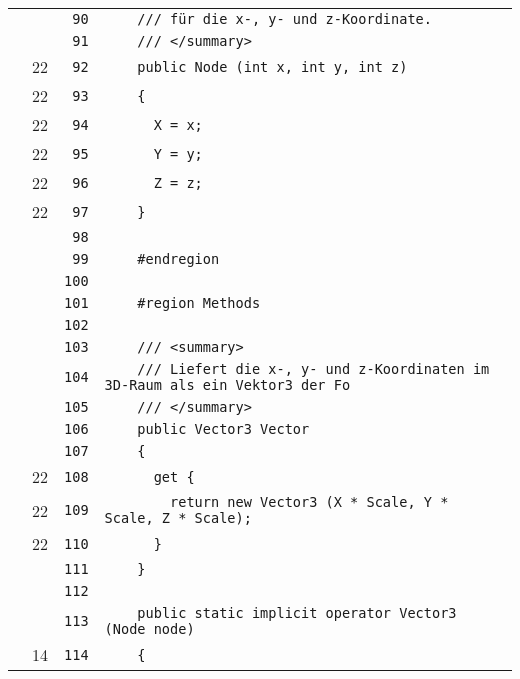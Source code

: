 \documentclass[a4paper,10pt]{article}
\begin{document}
\begin{longtable}[l]{lrrl}
\cellcolor{gray} &  & \verb~90~ & \verb~    /// für die x-, y- und z-Koordinate.~\\
\cellcolor{gray} &  & \verb~91~ & \verb~    /// </summary>~\\
\cellcolor{green} & 22 & \verb~92~ & \verb~    public Node (int x, int y, int z)~\\
\cellcolor{green} & 22 & \verb~93~ & \verb~    {~\\
\cellcolor{green} & 22 & \verb~94~ & \verb~      X = x;~\\
\cellcolor{green} & 22 & \verb~95~ & \verb~      Y = y;~\\
\cellcolor{green} & 22 & \verb~96~ & \verb~      Z = z;~\\
\cellcolor{green} & 22 & \verb~97~ & \verb~    }~\\
\cellcolor{gray} &  & \verb~98~ & \verb~~\\
\cellcolor{gray} &  & \verb~99~ & \verb~    #endregion~\\
\cellcolor{gray} &  & \verb~100~ & \verb~~\\
\cellcolor{gray} &  & \verb~101~ & \verb~    #region Methods~\\
\cellcolor{gray} &  & \verb~102~ & \verb~~\\
\cellcolor{gray} &  & \verb~103~ & \verb~    /// <summary>~\\
\cellcolor{gray} &  & \verb~104~ & \verb~    /// Liefert die x-, y- und z-Koordinaten im 3D-Raum als ein Vektor3 der Fo~\\
\cellcolor{gray} &  & \verb~105~ & \verb~    /// </summary>~\\
\cellcolor{gray} &  & \verb~106~ & \verb~    public Vector3 Vector~\\
\cellcolor{gray} &  & \verb~107~ & \verb~    {~\\
\cellcolor{green} & 22 & \verb~108~ & \verb~      get {~\\
\cellcolor{green} & 22 & \verb~109~ & \verb~        return new Vector3 (X * Scale, Y * Scale, Z * Scale);~\\
\cellcolor{green} & 22 & \verb~110~ & \verb~      }~\\
\cellcolor{gray} &  & \verb~111~ & \verb~    }~\\
\cellcolor{gray} &  & \verb~112~ & \verb~~\\
\cellcolor{gray} &  & \verb~113~ & \verb~    public static implicit operator Vector3 (Node node)~\\
\cellcolor{green} & 14 & \verb~114~ & \verb~    {~\\

\end{longtable}
\end{document}
